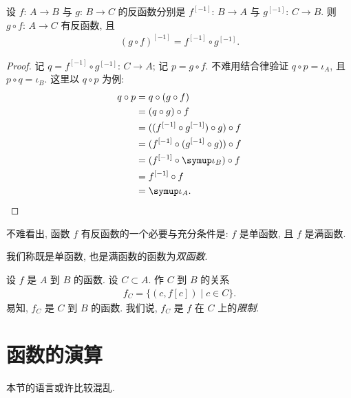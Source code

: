 \begin{theorem}
    设 $f$: $A \to B$ 与 $g$: $B \to C$ 的反函数分别是 $f^{[-1]}$: $B \to A$ 与 $g^{[-1]}$: $C \to B$. 则 $g \circ f$: $A \to C$ 有反函数, 且
    \begin{align*}
        {(g \circ f)}^{[-1]} = f^{[-1]} \circ g^{[-1]}.
    \end{align*}
\end{theorem}

\begin{proof}
    记 $q = f^{[-1]} \circ g^{[-1]}$: $C \to A$; 记 $p = g \circ f$. 不难用结合律验证 $q \circ p = \iota_A$, 且 $p \circ q = \iota_B$. 这里以 $q \circ p$ 为例:
    \begin{align*}
        q \circ p
        = {} & q \circ (g \circ f)                         \\
        = {} & (q \circ g) \circ f                         \\
        = {} & ((f^{[-1]} \circ g^{[-1]}) \circ g) \circ f \\
        = {} & (f^{[-1]} \circ (g^{[-1]} \circ g)) \circ f \\
        = {} & (f^{[-1]} \circ \iota_B) \circ f            \\
        = {} & f^{[-1]} \circ f                            \\
        = {} & \iota_A. \qedhere
    \end{align*}
\end{proof}

\begin{remark}
    不难看出, 函数 $f$ 有反函数的一个必要与充分条件是: $f$ 是单函数, 且 $f$ 是满函数.

    我们称既是单函数, 也是满函数的函数为\emph{双函数}.
\end{remark}

\begin{definition}
    设 $f$ 是 $A$ 到 $B$ 的函数. 设 $C \subset A$. 作 $C$ 到 $B$ 的关系
    \begin{align*}
        f_C = \{ (c, f[c]) \mid c \in C \}.
    \end{align*}
    易知, $f_C$ 是 $C$ 到 $B$ 的函数. 我们说, $f_C$ 是 $f$ 在 $C$ 上的\emph{限制}.
\end{definition}

\section{函数的演算}

\begin{remark*}
    本节的语言或许比较混乱.
\end{remark*}

